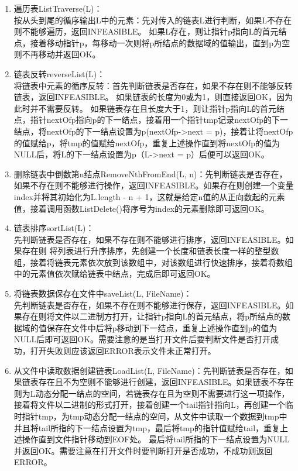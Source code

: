 \documentclass[supercite]{Experimental_Report}
\theoremstyle{definition}
\begin{document}
\begin{enumerate}
	\item 遍历表ListTraverse(L)：\\按从头到尾的循序输出L中的元素：先对传入的链表L进行判断，如果L不存在则不能够遍历，返回INFEASIBLE。
	      如果L存在，则让指针p指向L的首元结点，接着移动指针p，每移动一次则将p所结点的数据域的值输出，直到p为空则不再移动并返回OK。
		  
	\item 链表反转reverseList(L)：\\将链表中元素的循序反转：首先判断链表是否存在，如果不存在则不能够反转链表，返回INFEASIBLE。
	      如果链表的长度为0或为1，则直接返回OK，因为此时并不需要反转。
	      如果链表存在且长度大于1，则让指针p指向L的首元结点，指针nextOfp指向p的下一结点，接着用一个指针tmp记录nextOfp的下一结点，将nextOfp的下一结点设置为p(nextOfp->next = p)，接着让将nextOfp的值赋给p，将tmp的值赋给nextOfp，重复上述操作直到将nextOfp的值为NULL后，将L的下一结点设置为p（L->next = p）后便可以返回OK。
	\item 删除链表中倒数第n结点RemoveNthFromEnd(L, n)：先判断链表是否存在，如果不存在则不能够进行操作，返回INFEASIBLE。如果存在则创建一个变量index并将其初始化为L.length - n + 1，这就是给定n值的从正向数起的元素值，接着调用函数ListDelete()将序号为index的元素删除即可返回OK。

	\item 链表排序sortList(L)：\\先判断链表是否存在，如果不存在则不能够进行排序，返回INFEASIBLE。如果存在则
	      将列表进行升序排序，先创建一个长度和链表长度一样的整型数组，接着将链表元素依次放到该数组中，对该数组进行快速排序，接着将数组中的元素值依次赋给链表中结点，完成后即可返回OK。

	\item 将链表数据保存在文件中saveList(L, FileName)：\\先判断链表是否存在，如果不存在则不能够进行保存，返回INFEASIBLE。如果存在则将文件以二进制方打开，让指针p指向L的首元结点，将p所结点的数据域的值保存在文件中后将p移动到下一结点，重复上述操作直到p的值为NULL后即可返回OK。需要注意的是当打开文件后要判断文件是否打开成功，打开失败则应该返回ERROR表示文件未正常打开。

	\item 从文件中读取数据创建链表LoadList(L, FileName)：先判断链表是否存在，如果链表存在且不为空则不能够进行创建，返回INFEASIBLE。如果链表不存在则为L动态分配一结点的空间，若链表存在且为空则不需要进行这一项操作，接着将文件以二进制的形式打开，接着创建一个tail指针指向L，再创建一个临时指针tmp，为tmp动态分配一结点的空间，从文件中读取一个数据到tmp中并且将tail所指的下一结点设置为tmp，最后将tmp的指针值赋给tail，重复上述操作直到文件指针移动到EOF处。
	      最后将tail所指的下一结点设置为NULL并返回OK。需要注意在打开文件时要判断打开是否成功，不成功则返回ERROR。
\end{enumerate}
\end{document}
